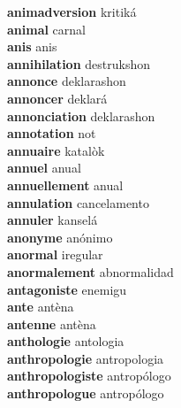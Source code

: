 \textbf{animadversion } kritiká \\
\textbf{animal } carnal \\
\textbf{anis } anis \\
\textbf{annihilation } destrukshon \\
\textbf{annonce } deklarashon \\
\textbf{annoncer } deklará \\
\textbf{annonciation } deklarashon \\
\textbf{annotation } not \\
\textbf{annuaire } katalòk \\
\textbf{annuel } anual \\
\textbf{annuellement } anual \\
\textbf{annulation } cancelamento \\
\textbf{annuler } kanselá \\
\textbf{anonyme } anónimo \\
\textbf{anormal } iregular \\
\textbf{anormalement } abnormalidad \\
\textbf{antagoniste } enemigu \\
\textbf{ante } antèna \\
\textbf{antenne } antèna \\
\textbf{anthologie } antologia \\
\textbf{anthropologie } antropologia \\
\textbf{anthropologiste } antropólogo \\
\textbf{anthropologue } antropólogo \\
